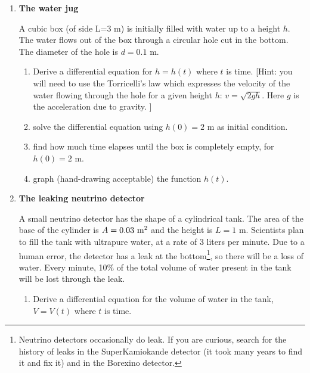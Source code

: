 \documentclass[fleqn]{article}
\begin{document}
\begin{enumerate}

  \item {\bf The water jug} 
  
  A cubic box (of side L=3 m) is initially filled with water up to a height  $h$. The water flows out of the box through a circular hole cut in the bottom. The diameter of the hole is $d=0.1$ m. 
  
  \begin{enumerate}
  
    \item Derive a differential equation for $h=h(t)$ where $t$ is time. [Hint: you will need to use the Torricelli's law which expresses the velocity of the water flowing through the hole for a given height  $h$:  $v=\sqrt{2 g h}$. Here $g$ is the acceleration due to gravity.  ]
    
    \item solve the differential equation using $h(0)=2$ m as initial condition. 
    
    \item find how much time elapses until the box is completely empty, for $h(0)=2$ m. 
    
    \item graph (hand-drawing acceptable) the function $h(t)$. 
  
  \end{enumerate}
  
  
  \item {\bf The leaking neutrino detector} 
  
  A small neutrino detector has the shape of a  cylindrical tank. The area of the base of the cylinder is $A=0.03~{\rm m^2}$ and the height is $L=1$ m. Scientists plan to fill the tank with ultrapure water, at a rate of 3 liters per minute. Due to a human error, the detector has a leak at the bottom\footnote{Neutrino detectors occasionally do leak. If you are curious, search for the history of leaks in the SuperKamiokande detector (it took many years to find it and fix it) and in the Borexino detector. }, so there will be a loss of water. Every minute, 10\% of the total volume of water present in the tank will be lost through the leak.  
  
  \begin{enumerate}
  
    \item Derive a differential equation for the volume of water in the tank, $V=V(t)$ where $t$ is time. 
    

\end{enumerate}
\end{enumerate}
\end{document}
